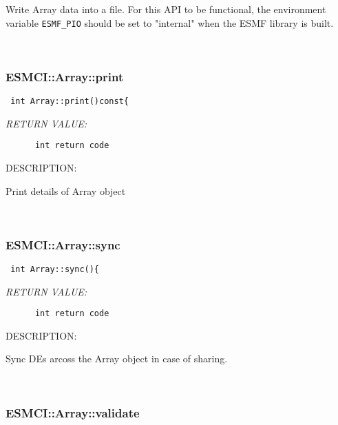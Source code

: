      Write Array data into a file. For this API to be functional, the
     environment variable {\tt ESMF\_PIO} should be set to "internal" when
     the ESMF library is built.
   
 
\mbox{}\hrulefill\
 
\subsubsection [ESMCI::Array::print] {ESMCI::Array::print}


  
\begin{verbatim} int Array::print()const{\end{verbatim}{\em RETURN VALUE:}
\begin{verbatim}      int return code\end{verbatim}
{\sf DESCRIPTION:\\ }


      Print details of Array object
   
 
\mbox{}\hrulefill\
 
\subsubsection [ESMCI::Array::sync] {ESMCI::Array::sync}


  
\begin{verbatim} int Array::sync(){\end{verbatim}{\em RETURN VALUE:}
\begin{verbatim}      int return code\end{verbatim}
{\sf DESCRIPTION:\\ }


      Sync DEs arcoss the Array object in case of sharing.
   
 
\mbox{}\hrulefill\
 
\subsubsection [ESMCI::Array::validate] {ESMCI::Array::validate}


